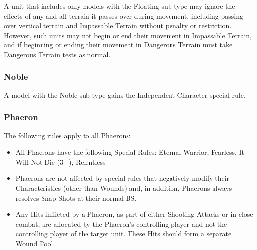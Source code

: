 A unit that includes only models with the Floating sub-type may ignore the effects of any and all terrain it passes over during movement, including passing over vertical terrain and Impassable Terrain without penalty or restriction. However, such units may not begin or end their movement in Impassable Terrain, and if beginning or ending their movement in Dangerous Terrain must take Dangerous Terrain tests as normal.

\subsubsection{Noble} \label{Noble}

A model with the Noble sub-type gains the Independent Character special rule. \\

\subsubsection{Phaeron} \label{Phaeron}

The following rules apply to all Phaerons:
\begin{itemize}
	\item All Phaerons have the following Special Rules: Eternal Warrior, Fearless, It Will Not Die (3+), Relentless
	\item Phaerons are not affected by special rules that negatively modify their Characteristics (other than Wounds) and, in addition, Phaerons always resolves Snap Shots at their normal BS.
	\item Any Hits inflicted by a Phaeron, as part of either Shooting Attacks or in close combat, are allocated by the Phaeron’s controlling player and not the controlling player of the target unit. These Hits should form a separate Wound Pool.
\end{itemize}
